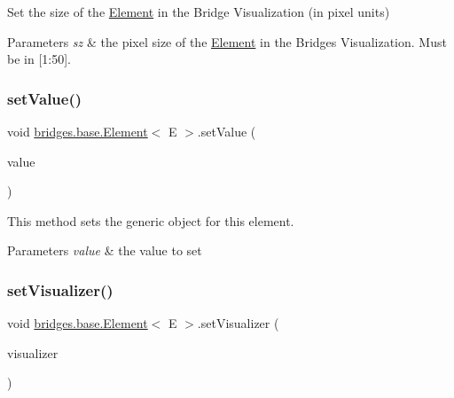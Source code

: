 Set the size of the \mbox{\hyperlink{classbridges_1_1base_1_1_element}{Element}} in the Bridge Visualization (in pixel units)


\begin{DoxyParams}{Parameters}
{\em sz} & the pixel size of the \mbox{\hyperlink{classbridges_1_1base_1_1_element}{Element}} in the Bridges Visualization. Must be in \mbox{[}1\+:50\mbox{]}. \\
\hline
\end{DoxyParams}
\mbox{\label{classbridges_1_1base_1_1_element_ab3cf1241da0bc4c59cea9d6f0fd7aaf4}} 
\subsubsection{\texorpdfstring{setValue()}{setValue()}}
{\footnotesize\ttfamily void \mbox{\hyperlink{classbridges_1_1base_1_1_element}{bridges.\+base.\+Element}}$<$ E $>$.set\+Value (\begin{DoxyParamCaption}\item[{E}]{value }\end{DoxyParamCaption})}

This method sets the generic object for this element.


\begin{DoxyParams}{Parameters}
{\em value} & the value to set \\
\hline
\end{DoxyParams}
\mbox{\label{classbridges_1_1base_1_1_element_a5befa95788099f1bc72cdf5361c55bed}} 
\subsubsection{\texorpdfstring{setVisualizer()}{setVisualizer()}}
{\footnotesize\ttfamily void \mbox{\hyperlink{classbridges_1_1base_1_1_element}{bridges.\+base.\+Element}}$<$ E $>$.set\+Visualizer (\begin{DoxyParamCaption}\item[{\mbox{\hyperlink{classbridges_1_1base_1_1_element_visualizer}{Element\+Visualizer}}}]{visualizer }\end{DoxyParamCaption})}

